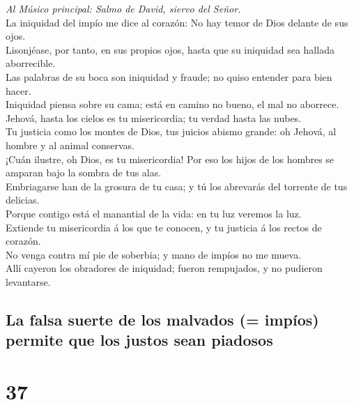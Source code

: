  \emph{Al Músico principal: Salmo de David, siervo del
Señor.}\\
La iniquidad del impío me dice al corazón: No hay temor de Dios delante
de sus ojos.\\
 Lisonjéase, por tanto, en sus propios ojos, hasta que su
iniquidad sea hallada aborrecible.\\
 Las palabras de su boca son iniquidad y fraude; no quiso
entender para bien hacer.\\
 Iniquidad piensa sobre su cama; está en camino no bueno, el
mal no aborrece.\\
 Jehová, hasta los cielos es tu misericordia; tu verdad
hasta las nubes.\\
 Tu justicia como los montes de Dios, tus juicios abismo
grande: oh Jehová, al hombre y al animal conservas.\\
 ¡Cuán ilustre, oh Dios, es tu misericordia! Por eso los
hijos de los hombres se amparan bajo la sombra de tus alas.\\
 Embriagarse han de la grosura de tu casa; y tú los
abrevarás del torrente de tus delicias.\\
 Porque contigo está el manantial de la vida: en tu luz
veremos la luz.\\
 Extiende tu misericordia á los que te conocen, y tu
justicia á los rectos de corazón.\\
 No venga contra mí pie de soberbia; y mano de impíos no me
mueva.\\
 Allí cayeron los obradores de iniquidad; fueron
rempujados, y no pudieron levantarse.

\hypertarget{la-falsa-suerte-de-los-malvados-impuxedos-permite-que-los-justos-sean-piadosos}{%
\subsection{La falsa suerte de los malvados (= impíos) permite que los
justos sean
piadosos}\label{la-falsa-suerte-de-los-malvados-impuxedos-permite-que-los-justos-sean-piadosos}}

\hypertarget{section-36}{%
\section{37}\label{section-36}}

